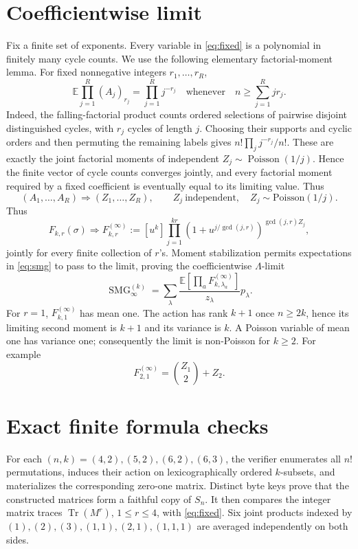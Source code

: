 \documentclass[11pt]{article}
\newcommand{\SMG}{\operatorname{SMG}}
\begin{document}
\section{Coefficientwise limit}
Fix a finite set of exponents.  Every variable in \eqref{eq:fixed} is a
polynomial in finitely many cycle counts.  We use the following elementary
factorial-moment lemma.  For fixed nonnegative integers $r_1,\ldots,r_R$,
\[
\mathbb E\prod_{j=1}^R(A_j)_{r_j}=\prod_{j=1}^Rj^{-r_j}
\quad\text{whenever}\quad n\geq\sum_{j=1}^Rjr_j.
\]
Indeed, the falling-factorial product counts ordered selections of pairwise
disjoint distinguished cycles, with $r_j$ cycles of length $j$.  Choosing
their supports and cyclic orders and then permuting the remaining labels gives
$n!\prod_jj^{-r_j}/n!$.  These are exactly the joint factorial moments of
independent $Z_j\sim\operatorname{Poisson}(1/j)$.  Hence the finite vector of
cycle counts converges jointly, and every factorial moment required by a fixed
coefficient is eventually equal to its limiting value.  Thus
\[
(A_1,\ldots,A_R)\Longrightarrow(Z_1,\ldots,Z_R),\qquad
Z_j\ \text{independent},\quad Z_j\sim\mathrm{Poisson}(1/j).
\]
Thus
\[
F_{k,r}(\sigma)\Longrightarrow F^{(\infty)}_{k,r}:=
[u^k]\prod_{j=1}^{kr}
(1+u^{j/\gcd(j,r)})^{\gcd(j,r)Z_j},
\]
jointly for every finite collection of $r$'s.  Moment stabilization permits
expectations in \eqref{eq:smg} to pass to the limit, proving the coefficientwise
$\Lambda$-limit
\[
\boxed{\SMG^{(k)}_\infty=\sum_\lambda
\frac{\mathbb E[\prod_aF^{(\infty)}_{k,\lambda_a}]}{z_\lambda}p_\lambda.}
\]
For $r=1$, $F^{(\infty)}_{k,1}$ has mean one.  The action has rank $k+1$
once $n\ge2k$, hence its limiting second moment is $k+1$ and its variance is
$k$.  A Poisson variable of mean one has variance one; consequently the limit
is non-Poisson for $k\ge2$.  For example
\[
F^{(\infty)}_{2,1}=\binom{Z_1}{2}+Z_2.
\]

\section{Exact finite formula checks}
For each $(n,k)=(4,2),(5,2),(6,2),(6,3)$, the verifier enumerates all $n!$
permutations, induces their action on lexicographically ordered $k$-subsets,
and materializes the corresponding zero-one matrix.  Distinct byte keys prove
that the constructed matrices form a faithful copy of $S_n$.  It then compares
the integer matrix traces $\operatorname{Tr}(M^r)$, $1\le r\le4$, with
\eqref{eq:fixed}.  Six joint products indexed by
$(1),(2),(3),(1,1),(2,1),(1,1,1)$ are averaged independently on both sides.
\end{document}
